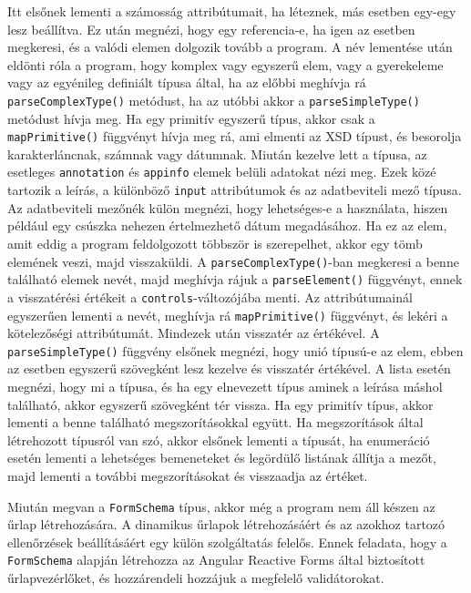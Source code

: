 Itt elsőnek lementi a számosság attribútumait, ha léteznek, más esetben egy-egy lesz beállítva. Ez után megnézi, hogy egy referencia-e, ha igen az esetben megkeresi, és a valódi elemen dolgozik tovább a program. A név lementése után eldönti róla a program, hogy komplex vagy egyszerű elem, vagy a gyerekeleme vagy az egyénileg definiált típusa által, ha az előbbi meghívja rá \texttt{parseComplexType()} metódust, ha az utóbbi akkor a \texttt{parseSimpleType()} metódust hívja meg. Ha egy primitív egyszerű típus, akkor csak a \texttt{mapPrimitive()} függvényt hívja meg rá, ami elmenti az XSD típust, és besorolja karakterláncnak, számnak vagy dátumnak. Miután kezelve lett a típusa, az esetleges \texttt{annotation} és \texttt{appinfo} elemek belüli adatokat nézi meg. Ezek közé tartozik a leírás, a különböző \texttt{input} attribútumok és az adatbeviteli mező típusa. Az adatbeviteli mezőnék külön megnézi, hogy lehetséges-e a használata, hiszen például egy csúszka nehezen értelmezhető dátum megadásához. Ha ez az elem, amit eddig a program feldolgozott többször is szerepelhet, akkor egy tömb elemének veszi, majd visszaküldi.
A \texttt{parseComplexType()}-ban megkeresi a benne található elemek nevét, majd meghívja rájuk a \texttt{parseElement()} függvényt, ennek a visszatérési értékeit a \texttt{controls}-változójába menti. Az attribútumainál egyszerűen lementi a nevét, meghívja rá \texttt{mapPrimitive()} függvényt, és lekéri a kötelezőségi attribútumát. Mindezek után visszatér az értékével.
A \texttt{parseSimpleType()} függvény elsőnek megnézi, hogy unió típusú-e az elem, ebben az esetben egyszerű szövegként lesz kezelve és visszatér értékével. A lista esetén megnézi, hogy mi a típusa, és ha egy elnevezett típus aminek a leírása máshol található, akkor egyszerű szövegként tér vissza. Ha egy primitív típus, akkor lementi a benne található megszorításokkal együtt. Ha megszorítások által létrehozott típusról van szó, akkor elsőnek lementi a típusát, ha enumeráció esetén lementi a lehetséges bemeneteket és legördülő listának állítja a mezőt, majd lementi a további megszorításokat és visszaadja az értéket.


Miután megvan a \texttt{FormSchema} típus, akkor még a program nem áll készen az űrlap létrehozására. A dinamikus űrlapok létrehozásáért és az azokhoz tartozó ellenőrzések beállításáért egy külön szolgáltatás felelős. Ennek feladata, hogy a \texttt{FormSchema} alapján létrehozza az Angular Reactive Forms által biztosított űrlapvezérlőket, és hozzárendeli hozzájuk a megfelelő validátorokat.

